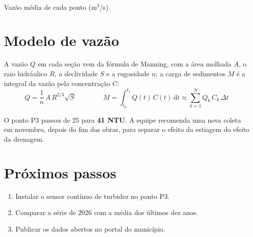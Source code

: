 \documentclass[11pt]{article}
\begin{document}
\begin{center}
\\[2pt]
{\small\color{nevoa} Vazão média de cada ponto (m$^3$/s).}
\end{center}

\section{Modelo de vazão}

A vazão $Q$ em cada seção vem da fórmula de Manning, com a área molhada $A$, o raio hidráulico $R$,
a declividade $S$ e a rugosidade $n$; a carga de sedimentos $M$ é a integral da vazão pela concentração $C$:
\begin{equation}
  Q = \frac{1}{n}\, A\, R^{2/3} \sqrt{S}
  \qquad\qquad
  M = \int_{t_0}^{t_1} Q(t)\, C(t)\, \mathrm{d}t \approx \sum_{k=1}^{N} Q_k\, C_k\, \Delta t
\end{equation}

\begin{tcolorbox}[colback=brasa!8, colframe=brasa, title=Destaque do trimestre, fonttitle=\bfseries]
  O ponto P3 passou de 25 para \textbf{41 NTU}. A equipe recomenda uma nova coleta em novembro,
  depois do fim das obras, para separar o efeito da estiagem do efeito da drenagem.
\end{tcolorbox}

\section{Próximos passos}

\begin{enumerate}
  \item Instalar o sensor contínuo de turbidez no ponto P3.
  \item Comparar a série de 2026 com a média dos últimos dez anos.
  \item Publicar os dados abertos no portal do município.
\end{enumerate}
\end{document}
